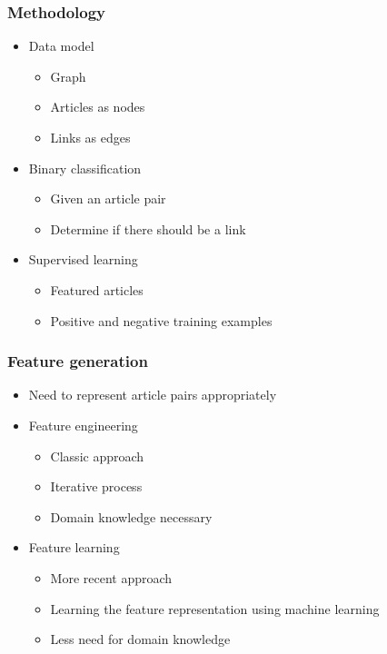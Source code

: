 \begin{frame}
    \frametitle{Methodology}
    \centering
    \begin{itemize}
      \item Data model
        \begin{itemize}
          \item Graph
          \item Articles as nodes
          \item Links as edges
        \end{itemize}
      \item Binary classification
        \begin{itemize}
          \item Given an article pair
          \item Determine if there should be a link
        \end{itemize}
      \item Supervised learning
        \begin{itemize}
          \item Featured articles
          \item Positive and negative training examples
        \end{itemize}
    \end{itemize}
\end{frame}

\begin{frame}
    \frametitle{Feature generation}
    \centering
    \begin{itemize}
      \item Need to represent article pairs appropriately
      \item Feature engineering
        \begin{itemize}
          \item Classic approach
          \item Iterative process
          \item Domain knowledge necessary
        \end{itemize}
      \item Feature learning
        \begin{itemize}
          \item More recent approach
          \item Learning the feature representation using machine learning
          \item Less need for domain knowledge
        \end{itemize}
    \end{itemize}
\end{frame}

